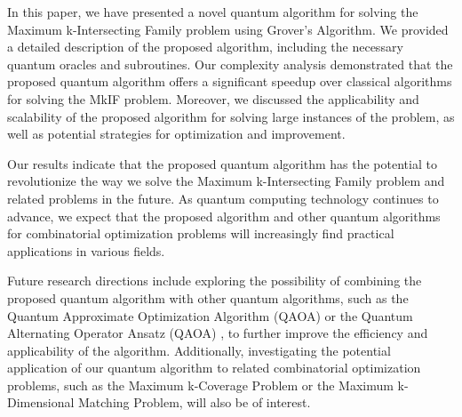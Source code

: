 In this paper, we have presented a novel quantum algorithm for solving the Maximum k-Intersecting Family problem using Grover's Algorithm. We provided a detailed description of the proposed algorithm, including the necessary quantum oracles and subroutines. Our complexity analysis demonstrated that the proposed quantum algorithm offers a significant speedup over classical algorithms for solving the MkIF problem. Moreover, we discussed the applicability and scalability of the proposed algorithm for solving large instances of the problem, as well as potential strategies for optimization and improvement.

Our results indicate that the proposed quantum algorithm has the potential to revolutionize the way we solve the Maximum k-Intersecting Family problem and related problems in the future. As quantum computing technology continues to advance, we expect that the proposed algorithm and other quantum algorithms for combinatorial optimization problems will increasingly find practical applications in various fields.

Future research directions include exploring the possibility of combining the proposed quantum algorithm with other quantum algorithms, such as the Quantum Approximate Optimization Algorithm (QAOA) \cite{farhi2014quantum} or the Quantum Alternating Operator Ansatz (QAOA) \cite{hadfield2019quantum}, to further improve the efficiency and applicability of the algorithm. Additionally, investigating the potential application of our quantum algorithm to related combinatorial optimization problems, such as the Maximum k-Coverage Problem or the Maximum k-Dimensional Matching Problem, will also be of interest.

